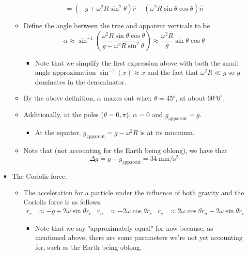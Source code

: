 \documentclass[../notes.tex]{subfiles}
\begin{document}
\begin{itemize}
\begin{itemize}
\begin{equation*}
            = (-g+\omega^2R\sin^2\theta)\hat{r}-(\omega^2R\sin\theta\cos\theta)\hat{n}
        \end{equation*}
        \item Define the angle between the true and apparent verticals to be
        \begin{equation*}
            \alpha \approx \sin^{-1}\left( \frac{\omega^2R\sin\theta\cos\theta}{g-\omega^2R\sin^2\theta} \right)
            \approx \frac{\omega^2R}{g}\sin\theta\cos\theta
        \end{equation*}
        \begin{itemize}
            \item Note that we simplify the first expression above with both the small angle approximation $\sin^{-1}(x)\approx x$ and the fact that $\omega^2R\ll g$ so $g$ dominates in the denominator.
        \end{itemize}
        \item By the above definition, $\alpha$ maxes out when $\theta=\ang{45}$, at about \ang{60}$6'$.
        \item Additionally, at the poles ($\theta=0,\pi$), $\alpha=0$ and $g_\text{apparent}=g$.
        \begin{itemize}
            \item At the equator, $g_\text{apparent}=g-\omega^2R$ is at its minimum.
        \end{itemize}
        \item Note that (not accounting for the Earth being oblong), we have that
        \begin{equation*}
            \Delta g = g-g_\text{apparent} = \SI[per-mode=symbol]{34}{\milli\meter\per\second\squared}
        \end{equation*}
    \end{itemize}
    \item The Coriolis force.
    \begin{itemize}
        \item The acceleration for a particle under the influence of both gravity and the Coriolis force is as follows.
        \begin{align*}
            \ddot{r}_r &\approx -g+2\omega\sin\theta\dot{r}_e&
            \ddot{r}_n &\approx -2\omega\cos\theta\dot{r}_e&
            \ddot{r}_e &\approx 2\omega\cos\theta\dot{r}_n-2\omega\sin\theta\dot{r}_r
        \end{align*}
        \begin{itemize}
            \item Note that we say "approximately equal" for now because, as mentioned above, there are some parameters we're not yet accounting for, such as the Earth being oblong.

\end{itemize}
\end{itemize}
\end{itemize}
\end{document}
